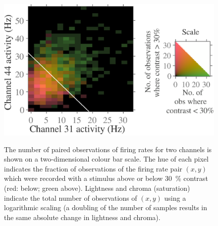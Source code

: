 \begin{figure}[htbp]
{        \includegraphics[scale=.29]{figs/decoding/lindiscrimexLCH-RG-log_cbl_v1_blanco_359_31vs44.eps}}
    \hspace*{\fill}\hspace{.2cm}\hspace*{\fill}
    \caption{
    The number of paired observations of firing rates for two channels is shown on a two-dimensional colour bar scale.
    The hue of each pixel indicates the fraction of observations of the firing rate pair $(x,y)$ which were recorded with a stimulus above or below \SI{30}{\percent} contrast (red: below; green above).
    Lightness and chroma (saturation) indicate the total number of observations of $(x,y)$ using a logarithmic scaling (a doubling of the number of samples results in the same absolute change in lightness and chroma).
}
\end{figure}
